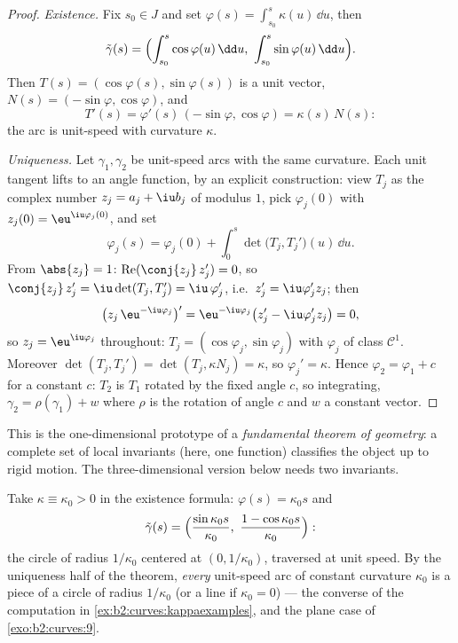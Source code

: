 \begin{proof}
\emph{Existence.} Fix $s_0 \in J$ and set $\varphi(s) =
\int_{s_0}^s \kappa(u)\,\dd u$, then
\[
\tilde\gamma(s) = \Bigl(\int_{s_0}^s \cos\varphi(u)\,\dd u,\
\int_{s_0}^s \sin\varphi(u)\,\dd u\Bigr).
\]
Then $T(s) = (\cos\varphi(s), \sin\varphi(s))$ is a unit vector,
$N(s) = (-\sin\varphi, \cos\varphi)$, and
\[
T'(s) = \varphi'(s)\,(-\sin\varphi, \cos\varphi)
= \kappa(s)\,N(s) :
\]
the arc is unit-speed with curvature $\kappa$.

\emph{Uniqueness.} Let $\gamma_1, \gamma_2$ be unit-speed arcs with
the same curvature. Each unit tangent lifts to an angle
function, by an explicit construction: view $T_j$ as the
complex number $z_j = a_j + \iu b_j$ of modulus $1$, pick
$\varphi_j(0)$ with $z_j(0) = \eu^{\iu\varphi_j(0)}$, and set
\[
\varphi_j(s) = \varphi_j(0) + \int_0^s\det\bigl(T_j,
T_j'\bigr)(u)\,\dd u .
\]
From $\abs{z_j} = 1$: $\operatorname{Re}(\conj{z_j}\,z_j') =
0$, so $\conj{z_j}\,z_j' = \iu\det(T_j, T_j') =
\iu\,\varphi_j'$, i.e.\ $z_j' = \iu\varphi_j'z_j$; then
\[
\bigl(z_j\,\eu^{-\iu\varphi_j}\bigr)'
= \eu^{-\iu\varphi_j}\bigl(z_j' - \iu\varphi_j'z_j\bigr) = 0,
\]
so $z_j = \eu^{\iu\varphi_j}$ throughout: $T_j =
(\cos\varphi_j, \sin\varphi_j)$ with $\varphi_j$ of class
$\mathcal C^1$. Moreover $\det(T_j, T_j') = \det(T_j,
\kappa N_j) = \kappa$, so $\varphi_j' = \kappa$. Hence $\varphi_2 = \varphi_1 + c$ for a
constant $c$: $T_2$ is $T_1$ rotated by the fixed angle $c$, so
integrating, $\gamma_2 = \rho(\gamma_1) + w$ where $\rho$ is the
rotation of angle $c$ and $w$ a constant vector.
\end{proof}

\begin{remark}
This is the one-dimensional prototype of a \emph{fundamental
theorem of geometry}: a complete set of local invariants (here, one
function) classifies the object up to rigid motion. The
three-dimensional version below needs two invariants.
\end{remark}

\begin{example}\label{ex:b2:curves:constantkappa}
Take $\kappa \equiv \kappa_0 > 0$ in the existence formula:
$\varphi(s) = \kappa_0 s$ and
\[
\tilde\gamma(s) = \Bigl(\frac{\sin\kappa_0s}{\kappa_0},\
\frac{1 - \cos\kappa_0s}{\kappa_0}\Bigr) :
\]
the circle of radius $1/\kappa_0$ centered at $(0,
1/\kappa_0)$, traversed at unit speed. By the uniqueness
half of the theorem, \emph{every} unit-speed arc of constant
curvature $\kappa_0$ is a piece of a circle of radius
$1/\kappa_0$ (or a line if $\kappa_0 = 0$) --- the converse
of the computation in \cref{ex:b2:curves:kappaexamples}, and
the plane case of \cref{exo:b2:curves:9}.
\end{example}


